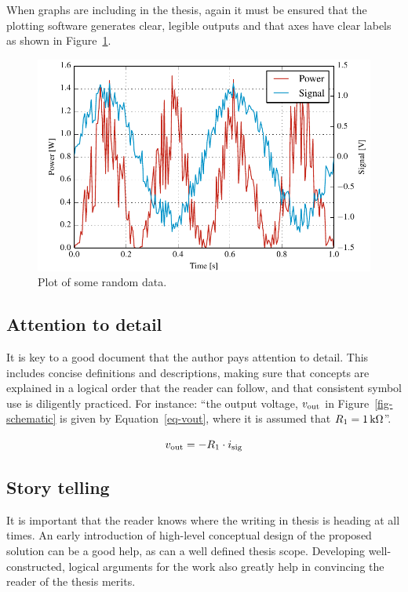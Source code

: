 When graphs are including in the thesis, again it must be ensured that the
plotting software generates clear, legible outputs and that axes have
clear labels as shown in Figure~\ref{fig-plot}.

\begin{figure}[ht!]
\centering
\includegraphics{plotout}
\caption{Plot of some random data.}
\label{fig-plot}
\end{figure}

\subsection{Attention to detail}

It is key to a good document that the author pays attention to detail.  This
includes concise definitions and descriptions, making sure that concepts are
explained in a logical order that the reader can follow, and that consistent
symbol use is diligently practiced.  For instance: ``the output voltage,
$v_{\rm out}$ in Figure~\ref{fig-schematic} is given by
Equation~\ref{eq-vout}, where it is assumed that $R_1=\unit[1]{k\Omega}$''. 

\begin{equation}
v_{\rm out}=-R_1\cdot i_{\rm sig}
\label{eq-vout}
\end{equation}

\subsection{Story telling}
It is important that the reader knows where the writing in thesis is heading
at all times.  An early introduction of high-level conceptual design of the
proposed solution can be a good help, as can a well defined thesis scope.
Developing well-constructed, logical arguments for the work also greatly
help in convincing the reader of the thesis merits.
